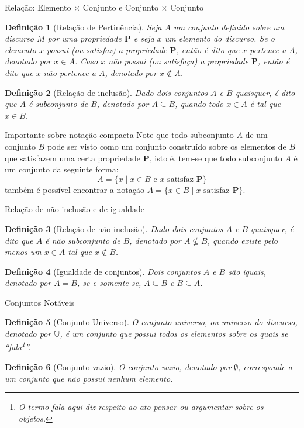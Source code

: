 \documentclass[aspectratio=169]{beamer}
\newtheorem{defi}{Definição}
\begin{document}
	\begin{frame}{Relação: Elemento $\times$ Conjunto e Conjunto $\times$ Conjunto}
		\begin{defi}[Relação de Pertinência]\label{def:Pertinencia}
			Seja $A$ um conjunto definido sobre um discurso $M$ por uma propriedade $\textbf{P}$ e seja $x$ um elemento do discurso. Se o elemento $x$ possui (ou satisfaz) a propriedade $\textbf{P}$, então é dito que $x$ pertence a $A$, denotado por $x \in A$. Caso $x$ não possui (ou satisfaça) a propriedade $\textbf{P}$, então é dito que $x$ não pertence a $A$, denotado por $x \notin A$.
		\end{defi}
		\begin{defi}[Relação de inclusão]\label{def:RelacaoInclusao}
			Dado dois conjuntos $A$ e $B$ quaisquer, é dito que $A$ é subconjunto de $B$, denotado por $A \subseteq B$, quando todo $x \in A$ é tal que $x \in B$.
		\end{defi}
	\end{frame}
	
	\begin{frame}{Importante sobre notação compacta}
		Note que todo subconjunto $A$ de um conjunto $B$ pode ser visto como um conjunto construído sobre os elementos de $B$ que satisfazem uma certa propriedade $\textbf{P}$, isto é, tem-se que todo subconjunto $A$ é um conjunto da seguinte forma:
		$$A = \{x \mid x \in B \mbox{ e } x \mbox{ satisfaz } \textbf{P}\}$$
		também é possível encontrar a notação $A = \{x \in B  \mid x \mbox{ satisfaz } \textbf{P}\}$.
	\end{frame}
	
	\begin{frame}{Relação de não inclusão e de igualdade}
		\begin{defi}[Relação de não inclusão]\label{def:RelacaoNaoInclusao}
			Dado dois conjuntos $A$ e $B$ quaisquer, é dito que $A$ é não subconjunto de $B$, denotado por $A \not\subseteq B$, quando existe pelo menos um $x \in A$ tal que $x \not\in B$.
		\end{defi}
		\begin{defi}[Igualdade de conjuntos]\label{def:IgualdadeConjuntos}
			Dois conjuntos $A$ e $B$ são iguais, denotado por $A = B$, se e somente se, $A \subseteq B$ e $B \subseteq A$.
		\end{defi}
	\end{frame}

	\begin{frame}{Conjuntos Notáveis}
		\begin{defi}[Conjunto Universo]\label{def:ConjuntoUniverso}
			O conjunto universo, ou universo do discurso, denotado por $\mathbb{U}$, é um conjunto que possui todos os elementos sobre os quais se ``fala\footnote{O termo fala aqui diz respeito ao ato pensar ou argumentar sobre os objetos.}''.
		\end{defi}
		\pause
		\begin{defi}[Conjunto vazio]\label{def:ConjuntoVazio}
			O conjunto vazio, denotado por $\emptyset$, corresponde a um conjunto que não possui nenhum elemento.
		\end{defi}
	\end{frame}
\end{document}
